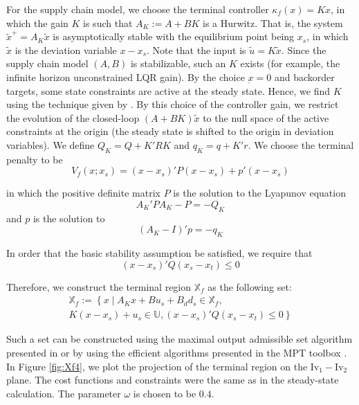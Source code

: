 \documentclass[10pt]{article}
\newcommand{\Inv}{\textrm{Iv}}
\theoremstyle{definition}
\begin{document}
For the supply chain model, we choose the terminal controller
$\kappa_f(x) = Kx$, in which the gain $K$ is such that $A_K :=A+BK$ is
a Hurwitz. That is, the system $\tilde{x}^+ = A_K\tilde{x}$ is
asymptotically stable with the equilibrium point being $x_s$, in
which $\tilde{x}$ is the deviation variable $x-x_s$. Note that the
input is $\tilde{u} = K\tilde{x}$.  Since the supply
chain model $(A,B)$ is stabilizable, such an $K$ exists (for example,
the infinite horizon unconstrained LQR gain). By the choice
$\underbar{x} = 0$  and backorder targets, some state constraints are
active at the steady state. Hence,  we find $K$ using the technique given by
\citet{rao:rawlings:1999}. By this choice of the controller gain, we
restrict the evolution of the closed-loop $(A+BK)\tilde{x}$ to the
null space of the active constraints at the origin (the steady state
is shifted to the origin in deviation variables). We define $Q_K = Q+K'RK$
and $q_K = q+K'r$. We choose the terminal penalty to be 
\begin{equation}
\label{eq:Vf}
V_f(x;x_s) = (x-x_s)'P(x-x_s)+ p'(x-x_s)
\end{equation}

in which the positive definite matrix $P$ is the solution to the
Lyapunov equation
\[ A_K'PA_K-P = -Q_K \]
and $p$ is the solution to 
\[ (A_K-I)'p = -q_K \]

In order that the basic stability assumption be satisfied, we require
that  
\begin{equation}
\label{eq:BSA_condition}
(x-x_s)'Q(x_s-x_t)  \leq 0
\end{equation}


Therefore, we construct the terminal region $\mathbb{X}_f$ as the
following set:
\begin{multline}
\label{eq:Xf}
\mathbb{X}_f := \left \lbrace x \mid A_Kx+Bu_s+B_dd_s \in
  \mathbb{X}_f, \right. \\ \left.
  K(x-x_s)+u_s \in \mathbb{U}, (x-x_s)'Q(x_s-x_t) \leq 0\right \rbrace
\end{multline}

Such a set can be constructed using the maximal output admissible set
algorithm presented in \citet{gilbert:tan:1991} or by using the
efficient algorithms presented in the MPT toolbox
\citep{kvasnica:grieder:baotic:2006}. In Figure \ref{fig:Xf4}, we plot
the projection of the terminal region on the $\Inv_1-\Inv_2$
plane. The cost functions and constraints were the same as in the
steady-state calculation. The parameter $\omega$ is chosen to be
$0.4$.
\end{document}
